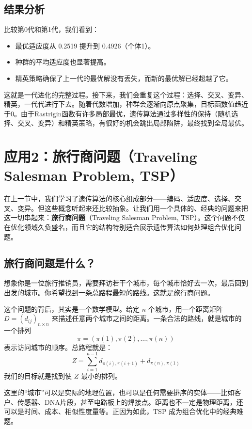 \documentclass[lang=cn,zihao=-4,a4paper,fontset=windows]{beautybook}
\begin{document}
\subsection{结果分析}

比较第0代和第1代，我们看到：
\begin{itemize}
    \item 最优适应度从 0.2519 提升到 0.4926（个体1）。
    \item 种群的平均适应度也显著提高。
    \item 精英策略确保了上一代的最优解没有丢失，而新的最优解已经超越了它。
\end{itemize}

这就是一代进化的完整过程。接下来，我们会重复这个过程：选择、交叉、变异、精英，一代代进行下去。随着代数增加，种群会逐渐向原点聚集，目标函数值趋近于0。由于Rastrigin函数有许多局部最优，遗传算法通过多样性的保持（随机选择、交叉、变异）和精英策略，有很好的机会跳出局部陷阱，最终找到全局最优。

\section{应用2：旅行商问题（Traveling Salesman Problem, TSP）}

在上一节中，我们学习了遗传算法的核心组成部分——编码、适应度、选择、交叉、变异。但这些概念听起来还比较抽象。让我们用一个具体的、经典的问题来把这一切串起来：\textbf{旅行商问题}（Traveling Salesman Problem, TSP）。这个问题不仅在优化领域久负盛名，而且它的结构特别适合展示遗传算法如何处理组合优化问题。

\subsection{旅行商问题是什么？}

想象你是一位旅行推销员，需要拜访若干个城市，每个城市恰好去一次，最后回到出发的城市。你希望找到一条总路程最短的路线。这就是旅行商问题。

这个问题的背后，其实是一个数学模型。给定 $n$ 个城市，用一个距离矩阵 $D = (d_{ij})_{n \times n}$ 来描述任意两个城市之间的距离。一条合法的路线，就是城市的一个排列 \[\pi = (\pi(1), \pi(2), \dots, \pi(n))\]表示访问城市的顺序。总路程就是：
\[
Z = \sum_{i=1}^{n-1} d_{\pi(i), \pi(i+1)} + d_{\pi(n), \pi(1)}
\]
我们的目标就是找到使 $Z$ 最小的排列。

这里的“城市”可以是实际的地理位置，也可以是任何需要排序的实体——比如客户、传感器、DNA片段，甚至电路板上的焊接点。距离也不一定是物理距离，还可以是时间、成本、相似性度量等。正因为如此，TSP 成为组合优化中的经典难题。
\end{document}
